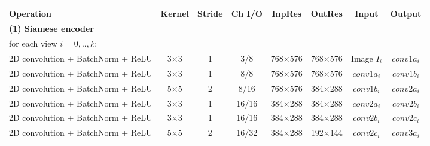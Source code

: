 \begin{table}[htbp]

\begin{adjustbox}{width=1\textwidth}
\def\arraystretch{1.75}
\begin{tabular}{|l|c|c|c|c|c|c|c|}
\hline
\rowcolor{bgcolor}
\textbf{Operation}                     & \textbf{Kernel} & \textbf{Stride} & \textbf{Ch I/O} & \textbf{InpRes} & \textbf{OutRes} & \textbf{Input}     & \textbf{Output} \\ \hline
\hline
\rowcolor{bgcolor}
\textbf{(1) Siamese encoder}           &                 &                 &                 &                 &                 &                    &                 \\ \hline
for each view $i = 0, .., k:$            &                 &                 &                 &                 &                 &                    &                 \\ \hline
\hspace{0.75cm}2D convolution + BatchNorm + ReLU                           & 3×3             & 1               & 3/8            & 768×576         & 768×576         & Image $I_i$           & $conv1a_i$          \\ \hline
\hspace{0.75cm}2D convolution + BatchNorm + ReLU                            & 3×3             & 1               & 8/8            & 768×576         & 768×576         & $conv1a_i$           & $conv1b_i$          \\ \hline
\hspace{0.75cm}2D convolution + BatchNorm + ReLU                            & 5×5             & 2               & 8/16           & 768×576          & 384×288         & $conv1b_i$            & $conv2a_i$          \\ \hline
\hspace{0.75cm}2D convolution + BatchNorm + ReLU                            & 3×3             & 1               & 16/16          & 384×288         & 384×288         &  $conv2a_i$           &  $conv2b_i$         \\ \hline
\hspace{0.75cm}2D convolution + BatchNorm + ReLU                            & 3×3             & 1               & 16/16          & 384×288         & 384×288         &  $conv2b_i$           &  $conv2c_i$          \\ \hline
\hspace{0.75cm}2D convolution + BatchNorm + ReLU                            & 5×5             & 2               & 16/32           & 384×288         & 192×144         & $conv2c_i$            & $conv3a_i$           \\ \hline

\end{tabular}
\end{adjustbox}
\end{table}
